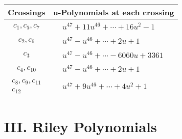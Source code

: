 \documentclass[1p]{elsarticle_modified}
\theoremstyle{definition}
\begin{document}
\begin{tabular}{m{50pt}|m{274pt}}
Crossings & \hspace{64pt}u-Polynomials at each crossing \\
\hline $$\begin{aligned}c_{1},c_{5},c_{7}\end{aligned}$$&$\begin{aligned}
&u^{47}+11 u^{46}+\cdots+16 u^2-1
\end{aligned}$\\
\hline $$\begin{aligned}c_{2},c_{6}\end{aligned}$$&$\begin{aligned}
&u^{47}- u^{46}+\cdots+2 u+1
\end{aligned}$\\
\hline $$\begin{aligned}c_{3}\end{aligned}$$&$\begin{aligned}
&u^{47}- u^{46}+\cdots-6060 u+3361
\end{aligned}$\\
\hline $$\begin{aligned}c_{4},c_{10}\end{aligned}$$&$\begin{aligned}
&u^{47}- u^{46}+\cdots+2 u+1
\end{aligned}$\\
\hline $$\begin{aligned}c_{8},c_{9},c_{11}\\c_{12}\end{aligned}$$&$\begin{aligned}
&u^{47}+9 u^{46}+\cdots+4 u^2+1
\end{aligned}$\\
\hline
\end{tabular}\newpage\renewcommand{\arraystretch}{1}
\centering \section*{ III. Riley Polynomials}
\end{document}
